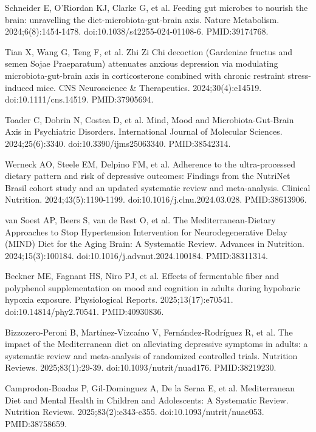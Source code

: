 \documentclass[12pt,oneside]{book}
\newcommand{\refend}{\endgroup\par}
\newcommand{\reff}[2]{\par\hangindent=7mm\hangafter=1\noindent[#1]\hspace{2mm}#2\par}
\begin{document}
\reff{33}{Schneider E, O'Riordan KJ, Clarke G, et al. Feeding gut microbes to nourish the brain: unravelling the diet-microbiota-gut-brain axis. Nature Metabolism. 2024;6(8):1454-1478. doi:10.1038/s42255-024-01108-6. PMID:39174768.}

\reff{34}{Tian X, Wang G, Teng F, et al. Zhi Zi Chi decoction (Gardeniae fructus and semen Sojae Praeparatum) attenuates anxious depression via modulating microbiota-gut-brain axis in corticosterone combined with chronic restraint stress-induced mice. CNS Neuroscience \& Therapeutics. 2024;30(4):e14519. doi:10.1111/cns.14519. PMID:37905694.}

\reff{35}{Toader C, Dobrin N, Costea D, et al. Mind, Mood and Microbiota-Gut-Brain Axis in Psychiatric Disorders. International Journal of Molecular Sciences. 2024;25(6):3340. doi:10.3390/ijms25063340. PMID:38542314.}

\reff{36}{Werneck AO, Steele EM, Delpino FM, et al. Adherence to the ultra-processed dietary pattern and risk of depressive outcomes: Findings from the NutriNet Brasil cohort study and an updated systematic review and meta-analysis. Clinical Nutrition. 2024;43(5):1190-1199. doi:10.1016/j.clnu.2024.03.028. PMID:38613906.}

\reff{37}{van Soest AP, Beers S, van de Rest O, et al. The Mediterranean-Dietary Approaches to Stop Hypertension Intervention for Neurodegenerative Delay (MIND) Diet for the Aging Brain: A Systematic Review. Advances in Nutrition. 2024;15(3):100184. doi:10.1016/j.advnut.2024.100184. PMID:38311314.}

\reff{38}{Beckner ME, Fagnant HS, Niro PJ, et al. Effects of fermentable fiber and polyphenol supplementation on mood and cognition in adults during hypobaric hypoxia exposure. Physiological Reports. 2025;13(17):e70541. doi:10.14814/phy2.70541. PMID:40930836.}

\reff{39}{Bizzozero-Peroni B, Martínez-Vizcaíno V, Fernández-Rodríguez R, et al. The impact of the Mediterranean diet on alleviating depressive symptoms in adults: a systematic review and meta-analysis of randomized controlled trials. Nutrition Reviews. 2025;83(1):29-39. doi:10.1093/nutrit/nuad176. PMID:38219230.}

\reff{40}{Camprodon-Boadas P, Gil-Dominguez A, De la Serna E, et al. Mediterranean Diet and Mental Health in Children and Adolescents: A Systematic Review. Nutrition Reviews. 2025;83(2):e343-e355. doi:10.1093/nutrit/nuae053. PMID:38758659.}

\refend
\end{document}
